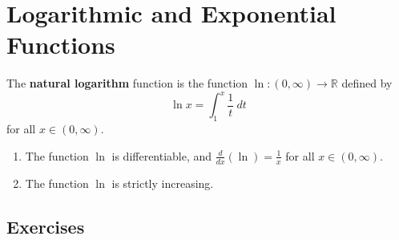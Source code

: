 \section{Logarithmic and Exponential Functions}
\begin{definition}
	\label{definition-7.2.1}
	The \textbf{natural logarithm} function is the function $\ln : \left( 0, \infty \right) \to \mathbb{R}$ defined by
	\begin{equation}
	\ln x = \int_{1}^{x}\frac{1}{t}\ dt
	\end{equation}
	for all $x \in \left(0, \infty\right)$.
\end{definition}

\begin{theorem}
	\label{theorem-7.2.2}
	{\color{white}{content...}}
	\begin{enumerate}
		\item The function $\ln$ is differentiable, and $\frac{d}{dx}\left(\ln\right) = \frac{1}{x}$ for all $x \in \left( 0, \infty \right)$.
		\item The function $\ln$ is strictly increasing.
	\end{enumerate}
\end{theorem}

\subsection{Exercises}

\setcounter{exercise}{6}

